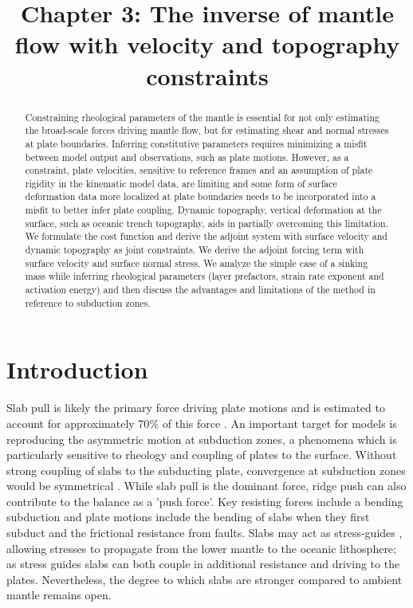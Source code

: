 \documentclass[12pt]{article}
\title{Chapter 3: The inverse of mantle flow with velocity and topography constraints}
\begin{document}
\maketitle

\begin{abstract}
Constraining rheological parameters of the mantle is essential for not only estimating the broad-scale forces driving mantle flow, 
but for estimating shear and normal stresses at plate boundaries. Inferring constitutive parameters requires minimizing a misfit between model output and observations, such as plate motions. However, as a constraint, plate velocities, sensitive to reference frames and an assumption of plate rigidity in the kinematic model data, 
are limiting and some form of surface deformation data more localized at plate boundaries
needs to be incorporated into a misfit to better infer plate coupling. Dynamic topography, vertical deformation at the surface, such as oceanic trench topography, aids in partially overcoming this limitation. We formulate the cost function and derive the adjoint system with surface velocity and dynamic topography as joint constraints. We derive the adjoint forcing term with surface velocity and surface normal stress. We analyze the simple case of a sinking mass while inferring rheological parameters (layer prefactors, strain rate exponent and activation energy) and then discuss the advantages and limitations of the method in reference to subduction zones. 

\end{abstract}

\section*{Introduction}
  Slab pull is likely the primary force driving plate motions \citep{Forsyth01101975,JGR13769} and is estimated to account for approximately 70$\%$ of this force \citep{Conrad04102002}. An important target for models is reproducing the asymmetric motion at subduction zones, a phenomena which is particularly sensitive to rheology and coupling of plates to the surface. Without strong coupling of slabs to the subducting plate, convergence at subduction zones would be symmetrical \citep{Conrad04102002}. While slab pull is the dominant force, ridge push can also contribute to the balance as a 'push force'. Key resisting forces include a bending subduction and plate motions include the bending of slabs when they first subduct and the frictional resistance from faults.  Slabs may act as stress-guides \citep{Stadler27082010}, allowing stresses to propagate from the lower mantle to the oceanic lithosphere; as stress guides slabs can both couple in additional resistance and driving to the plates. Nevertheless, the degree to which slabs are stronger compared to ambient mantle remains open. 
  
\end{document}
